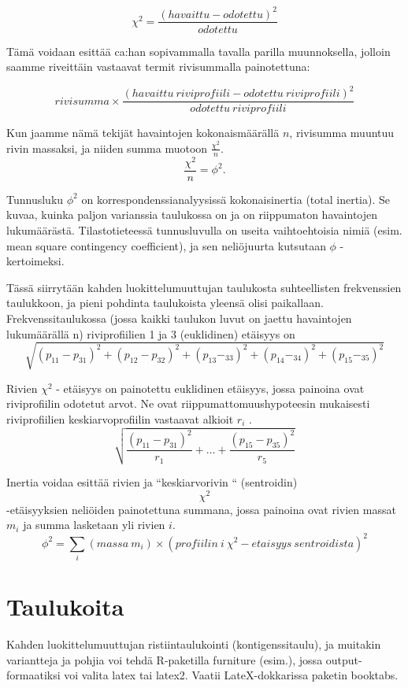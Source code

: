 \documentclass[12pt,a4paper,leqno]{article}
\theoremstyle{plain}
\theoremstyle{definition}
\theoremstyle{remark}
\begin{document}
\[
\chi^{2} = \frac{(havaittu - odotettu)^2} {odotettu}
\]

Tämä voidaan esittää ca:han sopivammalla tavalla parilla muunnoksella, jolloin saamme riveittäin vastaavat termit rivisummalla painotettuna:

\[
rivisumma \times \frac{(havaittu \: riviprofiili - odotettu \: riviprofiili)^2} {odotettu \: riviprofiili}
\]

Kun jaamme nämä tekijät havaintojen kokonaismäärällä $n$, rivisumma muuntuu rivin massaksi, ja niiden summa muotoon $\frac{\chi^{2}}{n}$.
\[
 \frac{\chi^{2}}{n} = \phi^{2} .
 \]
 
Tunnusluku $\phi^{2}$ on korrespondenssianalyysissä kokonaisinertia (total inertia). Se kuvaa, kuinka paljon varianssia taulukossa on ja on riippumaton havaintojen lukumäärästä. Tilastotieteessä tunnusluvulla on useita vaihtoehtoisia nimiä (esim. mean square contingency coefficient), ja sen neliöjuurta kutsutaan $\phi$ - kertoimeksi.

Tässä siirrytään kahden luokittelumuuttujan taulukosta suhteellisten frekvenssien taulukkoon, ja pieni pohdinta taulukoista yleensä olisi paikallaan.\\
 
Frekvenssitaulukossa (jossa kaikki taulukon luvut on jaettu havaintojen lukumäärällä n) riviprofiilien 1 ja 3  (euklidinen) etäisyys on 
 \[
 \sqrt{(p_{11} - p_{31})^2 + (p_{12} - p_{32})^2 + (p_{13} - _{33})^2+ (p_{14} - _{34})^2+ (p_{15} - _{35})^2}
 \]
 
 
 Rivien $\chi^{2}$ - etäisyys on painotettu euklidinen etäisyys, jossa painoina ovat riviprofiilin odotetut arvot. Ne ovat riippumattomuushypoteesin mukaisesti riviprofiilien keskiarvoprofiilin vastaavat alkioit $r_{i}$ .
\[
 \sqrt{\frac{(p_{11} - p_{31})^2} { r_{1}} + \dots + \frac{(p_{15} - p_{35})^2} {r_{5}}}
\]

Inertia voidaa esittää rivien ja ``keskiarvorivin `` (sentroidin) $$\chi^{2}$$ -etäisyyksien neliöiden painotettuna summana, jossa painoina ovat rivien massat $m_{i}$ ja summa lasketaan yli rivien ${i}$.
\[
 \phi^{2} = \sum_{i} (massa \: m_{i}) \times (profiilin \: i \: \chi^{2} - etaisyys \: sentroidista)^{2}
\]
\section{Taulukoita}\label{tabl1}

Kahden luokittelumuuttujan ristiintaulukointi (kontigenssitaulu), ja muitakin variantteja ja pohjia voi tehdä R-paketilla furniture (esim.), jossa output-formaatiksi voi valita latex tai latex2. Vaatii LateX-dokkarissa paketin booktabs.
\end{document}

